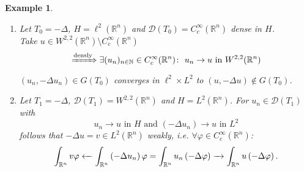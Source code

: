 \documentclass[12pt]{extreport} %
\newcommand{\N}{\mathbb{N}}
\newcommand{\R}{\mathbb{R}}
\newcommand{\DO}[1]{\mathcal{D}\left( {#1} \right)}
\theoremstyle{named}
\theoremstyle{nnamed}
\theoremstyle{itshape}
\theoremstyle{normal}
\newtheorem*{example}{Example}
\begin{document}
\begin{example} ~\
	\begin{enumerate}
		\item Let $T_0 = - \Delta$, $H = \ell^2(\R^n)$ and $\DO{T_{0}} = C_c^\infty(\R^n)$ dense in $H$. ~\\
			Take $u \in W^{2,2}(\R^n) \setminus C_c^{\infty}(\R^n)$
			$$ \xRightarrow[]{\text{densly}} \exists (u_n)_{n \in \N} \in C_c^{\infty}(\R^n) \colon ~ u_n \rightarrow u \text{ in } W^{2,2}(\R^n) $$
			$\left( u_n, -\Delta u_n \right) \in G(T_0)$ converges in $\ell^2 \times L^2$ to $(u, -\Delta u) \notin G(T_0)$.
		\item Let $T_1 = - \Delta$, $\DO{T_1} = W^{2,2}(\R^n)$ and $H = L^2(\R^n)$. For $u_n \in \DO{T_1}$ with 
			$$ u_n \rightarrow u \text{ in } H \text{ and } \left( - \Delta u_n \right) \rightarrow u \text{ in } L^2 $$
			follows that $- \Delta u = v \in L^2(\R^n)$ weakly, i.e. $\forall \varphi \in C_c^{\infty}(\R^n)$:
			$$ \int_{\R^n} v \varphi \leftArrow \int_{\R^n} \left( - \Delta u_n \right) \varphi = \int_{\R^n} u_n \left( - \Delta \varphi \right) \rightArrow \int_{\R^n} u \left( - \Delta \varphi \right). $$
	\end{enumerate}
\end{example}


\appendix 

\renewcommand{\indexname}{Stichwortverzeichnis}
\printindex
\end{document}
